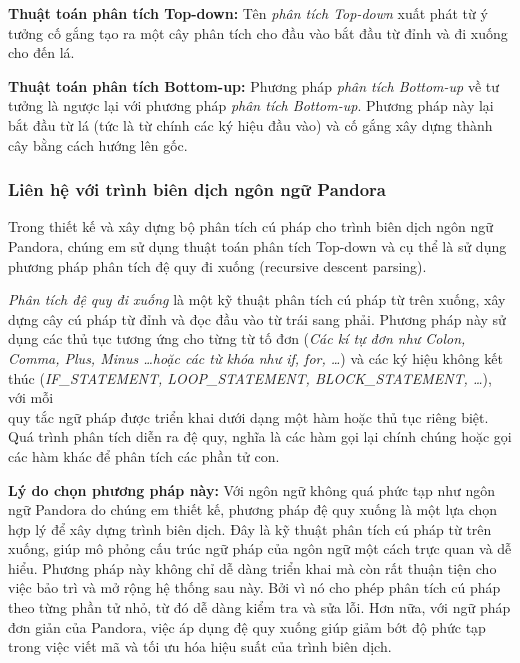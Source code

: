 \textbf{Thuật toán phân tích Top-down:}
Tên \textit{phân tích Top-down} xuất phát từ ý tưởng cố gắng tạo ra một cây phân tích cho đầu vào bắt đầu từ đỉnh và đi xuống cho đến lá.

\textbf{Thuật toán phân tích Bottom-up:}
Phương pháp \textit{phân tích Bottom-up} về tư tưởng là ngược lại với phương pháp \textit{phân tích Bottom-up}. Phương pháp này lại bắt đầu từ lá (tức là từ chính các ký hiệu đầu vào) và cố gắng xây dựng thành cây bằng cách hướng lên gốc.

\subsubsection{Liên hệ với trình biên dịch ngôn ngữ Pandora}
Trong thiết kế và xây dựng bộ phân tích cú pháp cho trình biên dịch ngôn ngữ Pandora, chúng em sử dụng thuật toán phân tích Top-down và cụ thể là sử dụng phương pháp phân tích đệ quy đi xuống (recursive descent parsing).

\textit{Phân tích đệ quy đi xuống} là một kỹ thuật phân tích cú pháp từ trên xuống, xây dựng cây cú pháp từ đỉnh và đọc đầu vào từ trái sang phải. Phương pháp này sử dụng các thủ tục tương ứng cho từng từ tố đơn (\textit{\emph{Các kí tự đơn như} Colon, Comma, Plus, Minus \dots \emph{hoặc các từ khóa như} if, for, \dots }) và các ký hiệu không kết thúc (\textit{IF\_STATEMENT, LOOP\_STATEMENT, BLOCK\_STATEMENT, \dots}), với mỗi \\quy tắc ngữ pháp được triển khai dưới dạng một hàm hoặc thủ tục riêng biệt. Quá trình phân tích diễn ra đệ quy, nghĩa là các hàm gọi lại chính chúng hoặc gọi các hàm khác để phân tích các phần tử con.

\textbf{Lý do chọn phương pháp này:} Với ngôn ngữ không quá phức tạp như ngôn ngữ Pandora do chúng em thiết kế, phương pháp đệ quy xuống là một lựa chọn hợp lý để xây dựng trình biên dịch. Đây là kỹ thuật phân tích cú pháp từ trên xuống, giúp mô phỏng cấu trúc ngữ pháp của ngôn ngữ một cách trực quan và dễ hiểu. Phương pháp này không chỉ dễ dàng triển khai mà còn rất thuận tiện cho việc bảo trì và mở rộng hệ thống sau này. Bởi vì nó cho phép phân tích cú pháp theo từng phần tử nhỏ, từ đó dễ dàng kiểm tra và sửa lỗi. Hơn nữa, với ngữ pháp đơn giản của Pandora, việc áp dụng đệ quy xuống giúp giảm bớt độ phức tạp trong việc viết mã và tối ưu hóa hiệu suất của trình biên dịch.